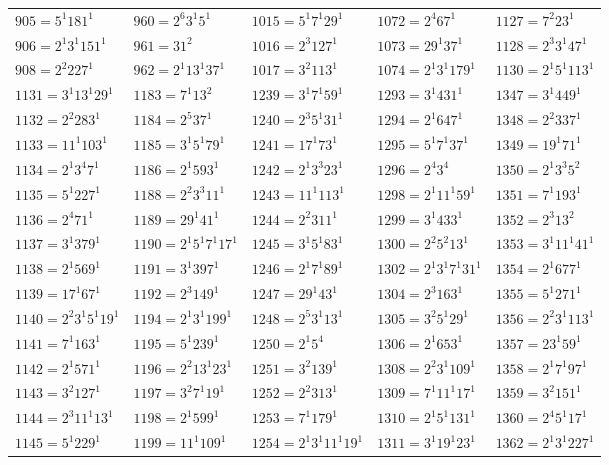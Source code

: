 {\begin{longtable}[c]{*{5}{l}}
$905=5^{1}181^{1}$&$960=2^{6}3^{1}5^{1}$&$1015=5^{1}7^{1}29^{1}$&$1072=2^{4}67^{1}$&$1127=7^{2}23^{1}$\\
$906=2^{1}3^{1}151^{1}$&$961=31^{2}$&$1016=2^{3}127^{1}$&$1073=29^{1}37^{1}$&$1128=2^{3}3^{1}47^{1}$\\
$908=2^{2}227^{1}$&$962=2^{1}13^{1}37^{1}$&$1017=3^{2}113^{1}$&$1074=2^{1}3^{1}179^{1}$&$1130=2^{1}5^{1}113^{1}$\\
\pagebreak
$1131=3^{1}13^{1}29^{1}$&$1183=7^{1}13^{2}$&$1239=3^{1}7^{1}59^{1}$&$1293=3^{1}431^{1}$&$1347=3^{1}449^{1}$\\
$1132=2^{2}283^{1}$&$1184=2^{5}37^{1}$&$1240=2^{3}5^{1}31^{1}$&$1294=2^{1}647^{1}$&$1348=2^{2}337^{1}$\\
$1133=11^{1}103^{1}$&$1185=3^{1}5^{1}79^{1}$&$1241=17^{1}73^{1}$&$1295=5^{1}7^{1}37^{1}$&$1349=19^{1}71^{1}$\\
$1134=2^{1}3^{4}7^{1}$&$1186=2^{1}593^{1}$&$1242=2^{1}3^{3}23^{1}$&$1296=2^{4}3^{4}$&$1350=2^{1}3^{3}5^{2}$\\
$1135=5^{1}227^{1}$&$1188=2^{2}3^{3}11^{1}$&$1243=11^{1}113^{1}$&$1298=2^{1}11^{1}59^{1}$&$1351=7^{1}193^{1}$\\
$1136=2^{4}71^{1}$&$1189=29^{1}41^{1}$&$1244=2^{2}311^{1}$&$1299=3^{1}433^{1}$&$1352=2^{3}13^{2}$\\
$1137=3^{1}379^{1}$&$1190=2^{1}5^{1}7^{1}17^{1}$&$1245=3^{1}5^{1}83^{1}$&$1300=2^{2}5^{2}13^{1}$&$1353=3^{1}11^{1}41^{1}$\\
$1138=2^{1}569^{1}$&$1191=3^{1}397^{1}$&$1246=2^{1}7^{1}89^{1}$&$1302=2^{1}3^{1}7^{1}31^{1}$&$1354=2^{1}677^{1}$\\
$1139=17^{1}67^{1}$&$1192=2^{3}149^{1}$&$1247=29^{1}43^{1}$&$1304=2^{3}163^{1}$&$1355=5^{1}271^{1}$\\
$1140=2^{2}3^{1}5^{1}19^{1}$&$1194=2^{1}3^{1}199^{1}$&$1248=2^{5}3^{1}13^{1}$&$1305=3^{2}5^{1}29^{1}$&$1356=2^{2}3^{1}113^{1}$\\
$1141=7^{1}163^{1}$&$1195=5^{1}239^{1}$&$1250=2^{1}5^{4}$&$1306=2^{1}653^{1}$&$1357=23^{1}59^{1}$\\
$1142=2^{1}571^{1}$&$1196=2^{2}13^{1}23^{1}$&$1251=3^{2}139^{1}$&$1308=2^{2}3^{1}109^{1}$&$1358=2^{1}7^{1}97^{1}$\\
$1143=3^{2}127^{1}$&$1197=3^{2}7^{1}19^{1}$&$1252=2^{2}313^{1}$&$1309=7^{1}11^{1}17^{1}$&$1359=3^{2}151^{1}$\\
$1144=2^{3}11^{1}13^{1}$&$1198=2^{1}599^{1}$&$1253=7^{1}179^{1}$&$1310=2^{1}5^{1}131^{1}$&$1360=2^{4}5^{1}17^{1}$\\
$1145=5^{1}229^{1}$&$1199=11^{1}109^{1}$&$1254=2^{1}3^{1}11^{1}19^{1}$&$1311=3^{1}19^{1}23^{1}$&$1362=2^{1}3^{1}227^{1}$\\

\end{longtable}}
